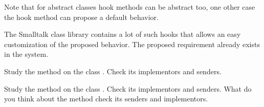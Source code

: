 Note that for abstract classes hook methods can be abstract too, 
one other case the hook method can propose a default behavior.


The Smalltalk class library contains a lot of such hooks that 
allows an easy customization of the proposed behavior. The proposed 
requirement already exists in the system. 

\exercise Study the method  on the class . 
Check its implementors and senders.

\exercise Study the method  on the class . 
Check its implementors and senders. What do you think about the method 
check its senders and implementors. 


\ifx\wholebook\relax\else\fi